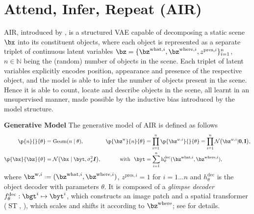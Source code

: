 \section{Attend, Infer, Repeat (\textsc{AIR})}
\label{sec:air}

\gls{AIR}, introduced by \cite{Eslami2016air}, is a structured \gls{VAE} capable of decomposing a static scene $\bx$ into its constituent objects, where each object is represented as a separate triplet of continuous latent variables $\bz = \{\bz^{\mathrm{what}, i}, \bz^{\mathrm{where}, i}, z^{\mathrm{pres},i}\}_{i=1}^n$, $n \in \mathbb{N}$ being the (random) number of objects in the scene.
Each triplet of latent variables explicitly encodes position, appearance and presence of the respective object, and the model is able to infer the number of objects present in the scene. Hence it is able to count, locate and describe objects in the scene, all learnt in an unsupervised manner, made possible by the inductive bias introduced by the model structure.

\textbf{Generative Model}
The generative model of \gls{AIR} is defined as follows
\begin{align}
\label{eq:air_gen}
    \p{n}{}{\theta} &= \mathrm{Geom} (n \mid \theta), 
    &
    \p{\bz^{\mathrm{w}}}{n}{\theta} &= \prod_{i=1}^n \p{\bz^{w,i}}{}{\theta} = \prod_{i=1}^n \gauss{\bz^{w,i}|\bf{0}, \bf{I}},\nonumber \\
    \p{\bx}{\bz}{\theta} &= \gauss{\bx \mid \byt, \sigma^2_x \bm{I}}, 
    &\text{with}~~\byt &= \sum_{i=1}^n \operatorname{h}^\mathrm{dec}_\theta (
        \bz^{\mathrm{what}, i}, \bz^{\mathrm{where}, i}
    ),
\end{align}
where $\bz^{\mathrm{w},i} \defeq (\bz^{\mathrm{what}, i}, \bz^{\mathrm{where}, i})$, $z^{\mathrm{pres}, i}=1$ for $i=1 \ldots n$ and $h^\mathrm{dec}_\theta$ is the object decoder with parameters $\theta$.
It is composed of a \textit{glimpse decoder} $f_\theta^\mathrm{dec}: \bgt^i \mapsto \byt^i$,
which constructs an image patch and a 
spatial transformer ($\operatorname{ST}$, \cite{Jaderberg2015}), which scales and shifts it according to $\bz^\mathrm{where}$; see  for details.

